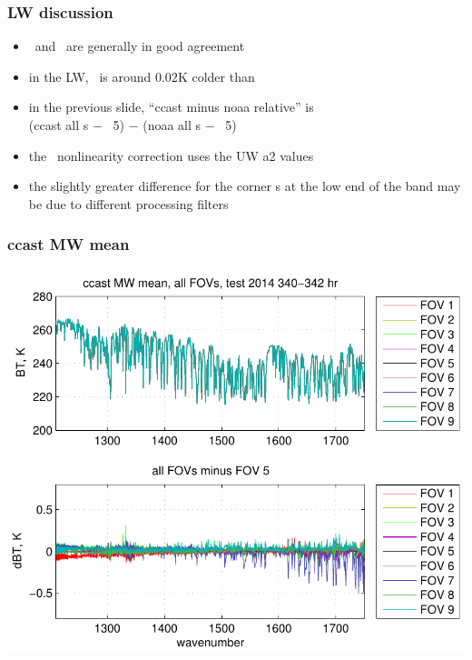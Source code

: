 \documentclass[11pt]{beamer}
\begin{document}
\begin{frame}
\frametitle{LW discussion}

\begin{itemize}

  \item \ccast\ and \noaa\ are generally in good agreement

  \item in the LW, \ccast\ is around $0.02$K colder than \noaa

  \item in the previous slide, ``ccast minus noaa relative'' is \\
    (ccast all \fov s $-$ \fov\ 5) $-$ (noaa all \fov s $-$ \fov\ 5)

  \item the \ccast\ nonlinearity correction uses the UW a2 values

  \item the slightly greater difference for the corner {\fov}s at the
    low end of the band may be due to different processing filters

\end{itemize}

\end{frame}
\begin{frame}
\frametitle{ccast MW mean}

\begin{center}
  \includegraphics[scale=0.7]{figures/ccast_MW_avg_2014_340-342_hr.pdf}
\end{center}

\end{frame}
\end{document}
